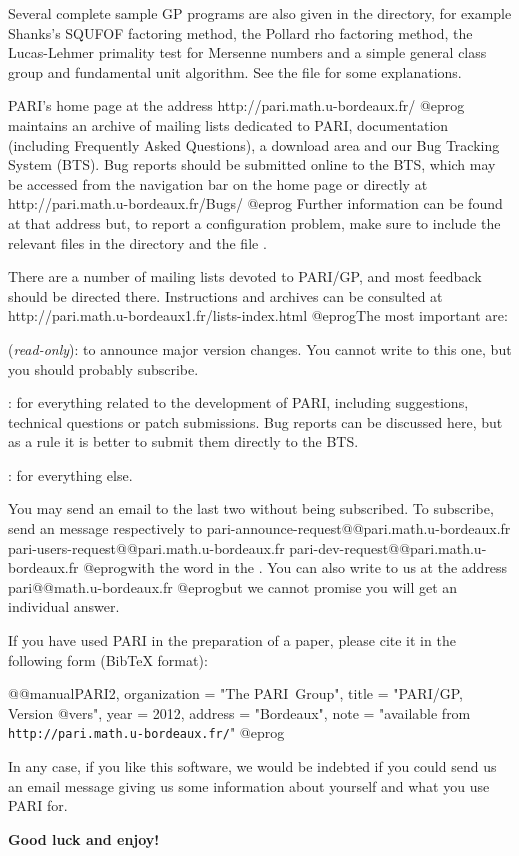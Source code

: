  Several complete sample GP programs are also given in
the  directory, for example Shanks's SQUFOF factoring method,
the Pollard rho factoring method, the Lucas-Lehmer primality test for
Mersenne numbers and a simple general class group and fundamental unit
algorithm. See the file  for some explanations.

 PARI's home page at the address
\bprog
  http://pari.math.u-bordeaux.fr/
@eprog\noindent
maintains an archive of mailing lists dedicated to PARI, documentation
(including Frequently Asked Questions), a download area and our Bug Tracking
System (BTS). Bug reports should be submitted online to the BTS, which may be
accessed from the navigation bar on the home page or directly at
\bprog
  http://pari.math.u-bordeaux.fr/Bugs/
@eprog\noindent
Further information can be found at that address but, to report a
configuration problem, make sure to include the relevant  files in
the  directory and the file .
\smallskip

There are a number of mailing lists devoted to PARI/GP, and most feedback
should be directed there. Instructions and archives can be consulted at
\bprog
  http://pari.math.u-bordeaux1.fr/lists-index.html
@eprog\noindent The most important are:

\item {} (\emph{read-only}): to announce major version
changes. You cannot write to this one, but you should probably subscribe.

\item {}: for everything related to the development of PARI,
including suggestions, technical questions or patch submissions. Bug reports
can be discussed here, but as a rule it is better to submit them directly
to the BTS.

\item {}: for everything else.

\noindent You may send an email to the last two without being subscribed.
To subscribe, send an message respectively to
\def\@{@}
\bprog
  pari-announce-request@@pari.math.u-bordeaux.fr
     pari-users-request@@pari.math.u-bordeaux.fr
       pari-dev-request@@pari.math.u-bordeaux.fr
@eprog\noindent with the word  in the .
You can also write to us at the address
\bprog
  pari@@math.u-bordeaux.fr
@eprog\noindent but we cannot promise you will get an individual answer.
\smallskip

If you have used PARI in the preparation of a paper, please cite it in the
following form (BibTeX format):

\bprog
@@manual{PARI2,
    organization = "{The PARI~Group}",
    title        = "{PARI/GP, Version @vers}",
    year         = 2012,
    address      = "Bordeaux",
    note         = "available from {\tt http://pari.math.u-bordeaux.fr/}"
}
@eprog
\smallskip

\noindent In any case, if you like this software, we would be indebted if you
could send us an email message giving us some information about yourself and
what you use PARI for.

\medskip
{\bf Good luck and enjoy!}
\vfill\eject
